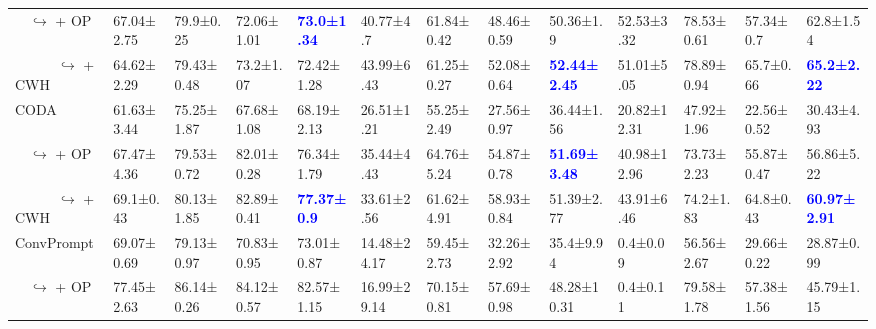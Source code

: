 \begin{table*}[htbp]
{\begin{tabular}{l|llla|llla|llla}
\ \  $\hookrightarrow$ + OP                  & 67.04{\scriptsize±2.75} & 79.9{\scriptsize±0.25} & 72.06{\scriptsize±1.01} & \textbf{\textcolor{blue}{73.0{\scriptsize±1.34}}} & 40.77{\scriptsize±4.7} & 61.84{\scriptsize±0.42} & 48.46{\scriptsize±0.59} & 50.36{\scriptsize±1.9} & 52.53{\scriptsize±3.32} & 78.53{\scriptsize±0.61} & 57.34{\scriptsize±0.7} & 62.8{\scriptsize±1.54} \\
\ \ \ \ \ \ $\hookrightarrow$ + CWH          & 64.62{\scriptsize±2.29} & 79.43{\scriptsize±0.48} & 73.2{\scriptsize±1.07} & 72.42{\scriptsize±1.28} & 43.99{\scriptsize±6.43} & 61.25{\scriptsize±0.27} & 52.08{\scriptsize±0.64} & \textbf{\textcolor{blue}{52.44{\scriptsize±2.45}}} & 51.01{\scriptsize±5.05} & 78.89{\scriptsize±0.94} & 65.7{\scriptsize±0.66} & \textbf{\textcolor{blue}{65.2{\scriptsize±2.22}}} \\
\hline
CODA                                         & 61.63{\scriptsize±3.44} & 75.25{\scriptsize±1.87} & 67.68{\scriptsize±1.08} & 68.19{\scriptsize±2.13} & 26.51{\scriptsize±1.21} & 55.25{\scriptsize±2.49} & 27.56{\scriptsize±0.97} & 36.44{\scriptsize±1.56} & 20.82{\scriptsize±12.31} & 47.92{\scriptsize±1.96} & 22.56{\scriptsize±0.52} & 30.43{\scriptsize±4.93} \\
\ \  $\hookrightarrow$ + OP                  & 67.47{\scriptsize±4.36} & 79.53{\scriptsize±0.72} & 82.01{\scriptsize±0.28} & 76.34{\scriptsize±1.79} & 35.44{\scriptsize±4.43} & 64.76{\scriptsize±5.24} & 54.87{\scriptsize±0.78} & \textbf{\textcolor{blue}{51.69{\scriptsize±3.48}}} & 40.98{\scriptsize±12.96} & 73.73{\scriptsize±2.23} & 55.87{\scriptsize±0.47} & 56.86{\scriptsize±5.22} \\
\ \ \ \ \ \ $\hookrightarrow$ + CWH          & 69.1{\scriptsize±0.43} & 80.13{\scriptsize±1.85} & 82.89{\scriptsize±0.41} & \textbf{\textcolor{blue}{77.37{\scriptsize±0.9}}} & 33.61{\scriptsize±2.56} & 61.62{\scriptsize±4.91} & 58.93{\scriptsize±0.84} & 51.39{\scriptsize±2.77} & 43.91{\scriptsize±6.46} & 74.2{\scriptsize±1.83} & 64.8{\scriptsize±0.43} & \textbf{\textcolor{blue}{60.97{\scriptsize±2.91}}} \\
\hline
ConvPrompt                                   & 69.07{\scriptsize±0.69} & 79.13{\scriptsize±0.97} & 70.83{\scriptsize±0.95} & 73.01{\scriptsize±0.87} & 14.48{\scriptsize±24.17} & 59.45{\scriptsize±2.73} & 32.26{\scriptsize±2.92} & 35.4{\scriptsize±9.94} & 0.4{\scriptsize±0.09} & 56.56{\scriptsize±2.67} & 29.66{\scriptsize±0.22} & 28.87{\scriptsize±0.99} \\
\ \  $\hookrightarrow$ + OP                  & 77.45{\scriptsize±2.63} & 86.14{\scriptsize±0.26} & 84.12{\scriptsize±0.57} & 82.57{\scriptsize±1.15} & 16.99{\scriptsize±29.14} & 70.15{\scriptsize±0.81} & 57.69{\scriptsize±0.98} & 48.28{\scriptsize±10.31} & 0.4{\scriptsize±0.11} & 79.58{\scriptsize±1.78} & 57.38{\scriptsize±1.56} & 45.79{\scriptsize±1.15} \\

\end{tabular}}
\end{table*}
